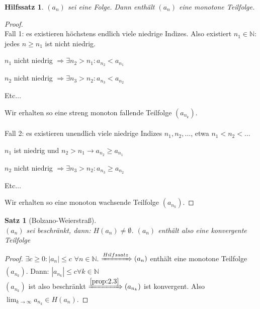 \documentclass[titlepage,ngerman,a4paper,headsepline,DIV15,halfparskip*,14pt]{scrartcl}
\newcommand{\N}{\mathbb{N}}
\theoremstyle{dotless}
\newtheorem{satz}{Satz}[section]
\newtheorem*{hilfssatz}{Hilfssatz}
\begin{document}
\begin{hilfssatz}
	$(a_{n})$ sei eine Folge. Dann enthält $(a_{n})$ eine monotone Teilfolge.	
\end{hilfssatz}

\begin{proof} ~\\
	Fall 1: es existieren höchstens endlich viele niedrige Indizes. Also existiert $n_{1} \in \N$: jedes $n \geq n_{1}$ ist nicht niedrig.
	\begin{description}
		\item $n_{1}$ nicht niedrig $\Rightarrow \exists n_{2} > n_{1} : a_{n_{2}} < a_{n_{1}}$
		\item $n_{2}$ nicht niedrig $\Rightarrow \exists n_{3} > n_{2} : a_{n_{3}} < a_{n_{2}}$
		\item Etc$\dotsc$
	\end{description}
	Wir erhalten so eine streng monoton fallende Teilfolge $(a_{n_{k}})$. \\ \\
	Fall 2: es existieren unendlich viele niedrige Indizes $n_{1}, n_{2}, \dotsc$, etwa $n_{1} < n_{2} < \dotsc$
	\begin{description}
		\item $n_{1}$ ist niedrig und $n_{2} > n_{1} \rightarrow a_{n_{2}} \geq a_{n_{1}}$
		\item $n_{2}$ nicht niedrig $\Rightarrow \exists n_{3} > n_{2} : a_{n_{3}} \geq a_{n_{2}}$
		\item Etc$\dotsc$
	\end{description}
	Wir erhalten so eine monoton wachsende Teilfolge $(a_{n_{k}})$.
\end{proof}

\begin{satz}[Bolzano-Weierstra{\ss}] \label{satz:2.12-BolzanoWeierstrass}  ~\\
	$(a_{n})$ sei beschränkt, dann: $H(a_{n}) \neq \emptyset$. $(a_{n})$ enthält also eine konvergente Teilfolge
\end{satz}

\begin{proof}
	$\exists c \geq 0: |a_{n}| \leq c$ $\forall n \in \N$. $\xRightarrow[]{Hilfssatz} (a_{n})$ enthält eine monotone Teilfolge $(a_{n_{k}})$. Dann: $|a_{n_{k}}| \leq c \forall k \in \N$ \\
	$(a_{n_{k}})$ ist also beschränkt $\xRightarrow[]{\ref{prop:2.3}} (a_{n_{k}})$ ist konvergent. Also $\lim_{k \rightarrow \infty} a_{n_{k}} \in H(a_{n})$.
\end{proof}
\end{document}
